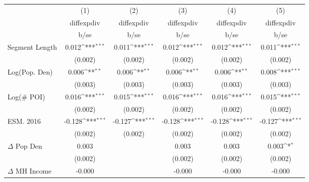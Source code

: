 {
\def\sym#1{\ifmmode^{#1}\else\(^{#1}\)\fi}
\begin{tabular}{l*{5}{c}}
\toprule
                    &\multicolumn{1}{c}{(1)}&\multicolumn{1}{c}{(2)}&\multicolumn{1}{c}{(3)}&\multicolumn{1}{c}{(4)}&\multicolumn{1}{c}{(5)}\\
                    &\multicolumn{1}{c}{diffexpdiv}&\multicolumn{1}{c}{diffexpdiv}&\multicolumn{1}{c}{diffexpdiv}&\multicolumn{1}{c}{diffexpdiv}&\multicolumn{1}{c}{diffexpdiv}\\
                    &        b/se         &        b/se         &        b/se         &        b/se         &        b/se         \\
\midrule
Segment Length      &       0.012\sym{***}&       0.011\sym{***}&       0.012\sym{***}&       0.012\sym{***}&       0.011\sym{***}\\
                    &     (0.002)         &     (0.002)         &     (0.002)         &     (0.002)         &     (0.002)         \\
Log(Pop. Den)       &       0.006\sym{**} &       0.006\sym{**} &       0.006\sym{**} &       0.006\sym{**} &       0.008\sym{***}\\
                    &     (0.003)         &     (0.003)         &     (0.003)         &     (0.003)         &     (0.003)         \\
Log($\#$ POI)       &       0.016\sym{***}&       0.015\sym{***}&       0.016\sym{***}&       0.016\sym{***}&       0.015\sym{***}\\
                    &     (0.002)         &     (0.002)         &     (0.002)         &     (0.002)         &     (0.002)         \\
ESM. 2016           &      -0.128\sym{***}&      -0.127\sym{***}&      -0.128\sym{***}&      -0.128\sym{***}&      -0.127\sym{***}\\
                    &     (0.002)         &     (0.002)         &     (0.002)         &     (0.002)         &     (0.002)         \\
$\Delta$ Pop Den    &       0.003         &                     &       0.003         &       0.003         &       0.003\sym{*}  \\
                    &     (0.002)         &                     &     (0.002)         &     (0.002)         &     (0.002)         \\
$\Delta$ MH Income  &      -0.000         &                     &      -0.000         &      -0.000         &      -0.000         \\

\end{tabular}}
